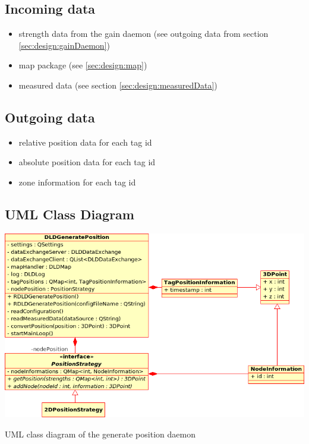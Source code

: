    \subsection{Incoming data}
    \begin{itemize}
     \item strength data from the gain daemon (see outgoing data from section \ref{sec:design:gainDaemon})
     \item map package (see \ref{sec:design:map})
     \item measured data (see section \ref{sec:design:measuredData})
    \end{itemize}

   \subsection{Outgoing data}
    \begin{itemize}
     \item relative position data for each tag id
     \item absolute position data for each tag id
     \item zone information for each tag id
    \end{itemize}

   \subsection{UML Class Diagram}
    \begin{staticFigure}
     \centering
     \includegraphics[scale=0.55]{UMLDiagrams/dldGeneratePosition.png}
     \caption{UML class diagram of the generate position daemon}
     \label{fg:projectModularization:generatePosition}
    \end{staticFigure}

